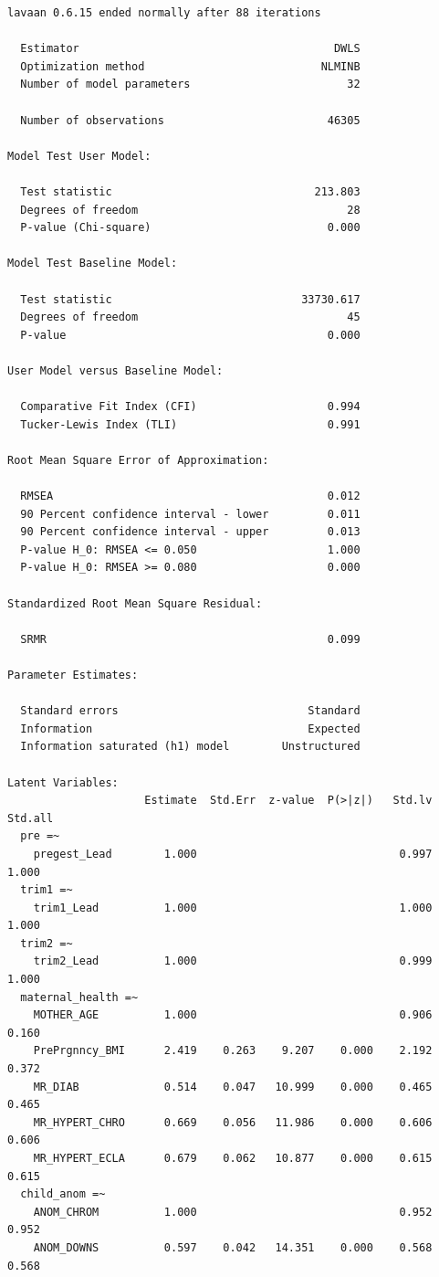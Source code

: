 \documentclass[
  letterpaper,
  DIV=11,
  numbers=noendperiod]{scrartcl}
\begin{document}
\begin{verbatim}
lavaan 0.6.15 ended normally after 88 iterations

  Estimator                                       DWLS
  Optimization method                           NLMINB
  Number of model parameters                        32

  Number of observations                         46305

Model Test User Model:
                                                      
  Test statistic                               213.803
  Degrees of freedom                                28
  P-value (Chi-square)                           0.000

Model Test Baseline Model:

  Test statistic                             33730.617
  Degrees of freedom                                45
  P-value                                        0.000

User Model versus Baseline Model:

  Comparative Fit Index (CFI)                    0.994
  Tucker-Lewis Index (TLI)                       0.991

Root Mean Square Error of Approximation:

  RMSEA                                          0.012
  90 Percent confidence interval - lower         0.011
  90 Percent confidence interval - upper         0.013
  P-value H_0: RMSEA <= 0.050                    1.000
  P-value H_0: RMSEA >= 0.080                    0.000

Standardized Root Mean Square Residual:

  SRMR                                           0.099

Parameter Estimates:

  Standard errors                             Standard
  Information                                 Expected
  Information saturated (h1) model        Unstructured

Latent Variables:
                     Estimate  Std.Err  z-value  P(>|z|)   Std.lv  Std.all
  pre =~                                                                  
    pregest_Lead        1.000                               0.997    1.000
  trim1 =~                                                                
    trim1_Lead          1.000                               1.000    1.000
  trim2 =~                                                                
    trim2_Lead          1.000                               0.999    1.000
  maternal_health =~                                                      
    MOTHER_AGE          1.000                               0.906    0.160
    PrePrgnncy_BMI      2.419    0.263    9.207    0.000    2.192    0.372
    MR_DIAB             0.514    0.047   10.999    0.000    0.465    0.465
    MR_HYPERT_CHRO      0.669    0.056   11.986    0.000    0.606    0.606
    MR_HYPERT_ECLA      0.679    0.062   10.877    0.000    0.615    0.615
  child_anom =~                                                           
    ANOM_CHROM          1.000                               0.952    0.952
    ANOM_DOWNS          0.597    0.042   14.351    0.000    0.568    0.568


\end{verbatim}
\end{document}
